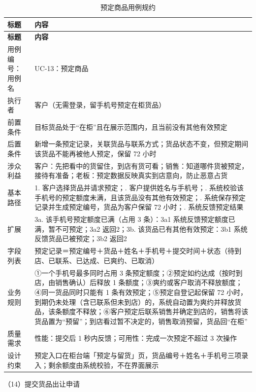 {\small
\begin{longtable}{@{}L{3.0cm} L{12.3cm}@{}}
\caption{预定商品用例规约}\label{tab:uc-13}\\
\toprule
\textbf{标题} & \textbf{内容} \\
\midrule
\endfirsthead
\toprule
\textbf{标题} & \textbf{内容} \\
\midrule
\endhead
用例编号：用例名 & UC-13：预定商品 \\
\midrule
执行者 & 客户（无需登录，留手机号预定在柜货品） \\
\midrule
前置条件 & 目标货品处于“在柜”且在展示范围内，且当前没有其他有效预定 \\
\midrule
后置条件 & 新增一条预定记录，关联货品与联系方式；货品状态不变，但预定期间该货品不能再被他人预定，保留 72 小时 \\
\midrule
涉众利益 & 客户：先把看中的货留住，到店有货可看；\newline 销售：知道哪件货被预定，接待有准备；\newline 老板：预定数据反映真实到店意向，防止恶意占货 \\
\midrule
基本路径 & 1. 客户选择货品并请求预定；. 客户提供姓名与手机号；. 系统校验该手机号的预定额度未满，且该货品没有其他有效预定；. 系统保存预定记录并生成预定编号，货品为客户保留 72 小时；. 系统反馈预定结果 \\
\midrule
扩展 & 3a. 该手机号预定额度已满（占用 3 条）：3a1 系统反馈预定额度已满，暂不可预定；3a2 返回2；\newline 3b. 该货品已有其他有效预定：3b1 系统反馈货品已被预定；3b2 返回2 \\
\midrule
字段列表 & 预定记录＝预定编号＋货品＋姓名＋手机号＋提交时间＋状态（待到店、已联系、已达成、已爽约、已取消） \\
\midrule
业务规则 & ①一个手机号最多同时占用 3 条预定额度；\newline ②预定如约达成（按时到店，由销售确认）后释放 1 条额度；\newline ③爽约或客户取消不释放额度；\newline ④同一货品同时只能有 1 条有效预定；\newline ⑤预定自登记起保留 72 小时，到期仍未处理（含已联系但未到店）的，系统自动置为爽约并释放货品，该条额度不释放；\newline ⑥客户预定后联系销售并确定到店的，销售将该货品置为“预留”；到店看过暂不决定的，销售取消预留，货品回“在柜” \\
\midrule
质量需求 & 性能：提交后 1 秒内反馈；\newline 可用性：完成一次预定不超过 3 次操作 \\
\midrule
设计约束 & 预定入口在柜台端「预定与留货」页，货品编号＋姓名＋手机号三项录入；剩余额度由系统校验，不在界面展示 \\
\midrule
\bottomrule
\end{longtable}}
\noindent（14）提交货品出让申请

